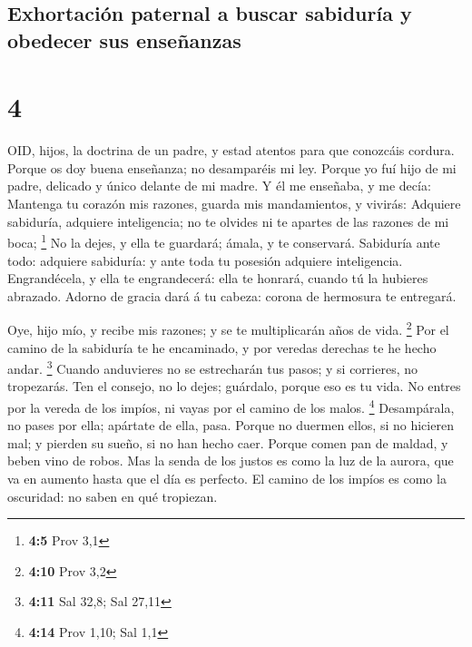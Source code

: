 \hypertarget{exhortaciuxf3n-paternal-a-buscar-sabiduruxeda-y-obedecer-sus-enseuxf1anzas}{%
\subsection{Exhortación paternal a buscar sabiduría y obedecer sus
enseñanzas}\label{exhortaciuxf3n-paternal-a-buscar-sabiduruxeda-y-obedecer-sus-enseuxf1anzas}}

\hypertarget{section-3}{%
\section{4}\label{section-3}}

 OID, hijos, la doctrina de un padre, y estad atentos para
que conozcáis cordura.  Porque os doy buena enseñanza; no
desamparéis mi ley.  Porque yo fuí hijo de mi padre,
delicado y único delante de mi madre.  Y él me enseñaba, y
me decía: Mantenga tu corazón mis razones, guarda mis mandamientos, y
vivirás:  Adquiere sabiduría, adquiere inteligencia; no te
olvides ni te apartes de las razones de mi boca; \footnote{\textbf{4:5}
  Prov 3,1}  No la dejes, y ella te guardará; ámala, y te
conservará.  Sabiduría ante todo: adquiere sabiduría: y ante
toda tu posesión adquiere inteligencia.  Engrandécela, y
ella te engrandecerá: ella te honrará, cuando tú la hubieres abrazado.
 Adorno de gracia dará á tu cabeza: corona de hermosura te
entregará.

 Oye, hijo mío, y recibe mis razones; y se te multiplicarán
años de vida. \footnote{\textbf{4:10} Prov 3,2}  Por el
camino de la sabiduría te he encaminado, y por veredas derechas te he
hecho andar. \footnote{\textbf{4:11} Sal 32,8; Sal 27,11} 
Cuando anduvieres no se estrecharán tus pasos; y si corrieres, no
tropezarás.  Ten el consejo, no lo dejes; guárdalo, porque
eso es tu vida.  No entres por la vereda de los impíos, ni
vayas por el camino de los malos. \footnote{\textbf{4:14} Prov 1,10; Sal
  1,1}  Desampárala, no pases por ella; apártate de ella,
pasa.  Porque no duermen ellos, si no hicieren mal; y
pierden su sueño, si no han hecho caer.  Porque comen pan
de maldad, y beben vino de robos.  Mas la senda de los
justos es como la luz de la aurora, que va en aumento hasta que el día
es perfecto.  El camino de los impíos es como la oscuridad:
no saben en qué tropiezan.

